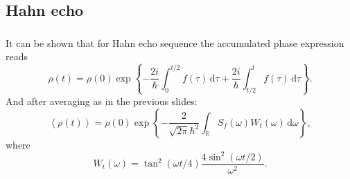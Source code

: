 \documentclass[aspectratio=169, 13pt, t]{beamer}
\newcommand{\diff}{\,\mathrm{d}}
\begin{document}
\subsection{Hahn echo}
\begin{frame}[t]\frametitle{\secname}\framesubtitle{\subsecname}
It can be shown that for Hahn echo sequence the accumulated phase expression reads
\begin{equation*}
\rho(t) = \rho(0)\exp \left\{ - \frac{2i}{\hbar}\int_0^{t/2} f(\tau)  \diff \tau + \frac{2i}{\hbar}\int_{t/2}^{t} f(\tau)  \diff \tau \right\}.
\end{equation*}
And after averaging as in the previous slides:
\[
\left<\rho(t)\right> = \rho(0)\exp \left\{ - \frac{2}{\sqrt{2\pi} \hbar^2} \int_\mathbb{R} S_f(\omega) W_t (\omega)\diff \omega \right\},
\label{eq:cdeph_se}
\]
where
\[
W_t (\omega) = \tan^2(\omega t/4)\frac{4 \sin^2(\omega t/2)}{\omega^2}.
\]
\end{frame}
\end{document}
